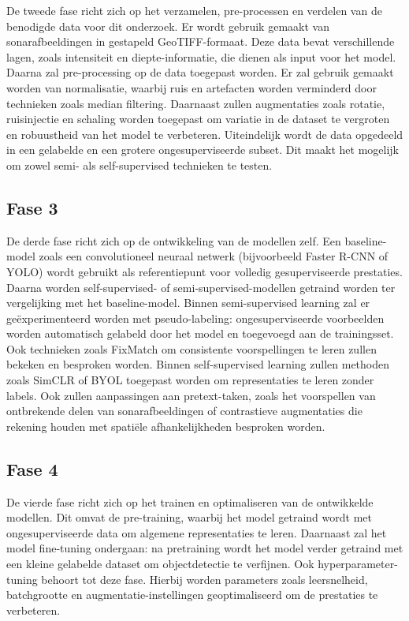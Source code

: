 De tweede fase richt zich op het verzamelen, pre-processen en verdelen van de benodigde data voor dit onderzoek. Er wordt gebruik gemaakt van sonarafbeeldingen in gestapeld GeoTIFF-formaat. Deze data bevat verschillende lagen, zoals intensiteit en diepte-informatie, die dienen als input voor het model. Daarna zal pre-processing op de data toegepast worden. Er zal gebruik gemaakt worden van normalisatie, waarbij ruis en artefacten worden verminderd door technieken zoals median filtering. Daarnaast zullen augmentaties zoals rotatie, ruisinjectie en schaling worden toegepast om variatie in de dataset te vergroten en robuustheid van het model te verbeteren. Uiteindelijk wordt de data opgedeeld in een gelabelde en een grotere ongesuperviseerde subset. Dit maakt het mogelijk om zowel semi- als self-supervised technieken te testen.

\subsection{Fase 3}

De derde fase richt zich op de ontwikkeling van de modellen zelf. Een baseline-model zoals een convolutioneel neuraal netwerk (bijvoorbeeld Faster R-CNN of YOLO) wordt gebruikt als referentiepunt voor volledig gesuperviseerde prestaties. Daarna worden self-supervised- of semi-supervised-modellen getraind worden ter vergelijking met het baseline-model. Binnen semi-supervised learning zal er geëxperimenteerd worden met pseudo-labeling: ongesuperviseerde voorbeelden worden automatisch gelabeld door het model en toegevoegd aan de trainingsset. Ook technieken zoals FixMatch om consistente voorspellingen te leren zullen bekeken en besproken worden. Binnen self-supervised learning zullen methoden zoals SimCLR of BYOL toegepast worden om representaties te leren zonder labels. Ook zullen aanpassingen aan pretext-taken, zoals het voorspellen van ontbrekende delen van sonarafbeeldingen of contrastieve augmentaties die rekening houden met spatiële afhankelijkheden besproken worden.

\subsection{Fase 4}

De vierde fase richt zich op het trainen en optimaliseren van de ontwikkelde modellen. Dit omvat de pre-training, waarbij het model getraind wordt met ongesuperviseerde data om algemene representaties te leren. Daarnaast zal het model fine-tuning ondergaan: na pretraining wordt het model verder getraind met een kleine gelabelde dataset om objectdetectie te verfijnen. Ook hyperparameter-tuning behoort tot deze fase. Hierbij worden parameters zoals leersnelheid, batchgrootte en augmentatie-instellingen geoptimaliseerd om de prestaties te verbeteren.


